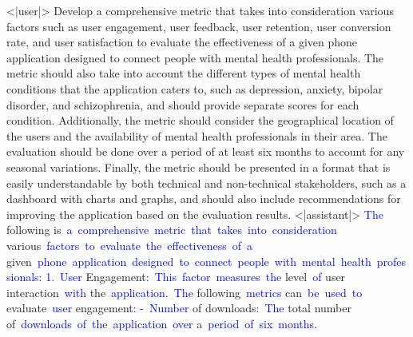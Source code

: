 \documentclass{article}
\begin{document}
\begin{tcolorbox}[colframe=black,colback=white]
<|user|>
Develop a comprehensive metric that takes into consideration various factors such as user engagement, user feedback, user retention, user conversion rate, and user satisfaction to evaluate the effectiveness of a given phone application designed to connect people with mental health professionals. The metric should also take into account the different types of mental health conditions that the application caters to, such as depression, anxiety, bipolar disorder, and schizophrenia, and should provide separate scores for each condition. Additionally, the metric should consider the geographical location of the users and the availability of mental health professionals in their area. The evaluation should be done over a period of at least six months to account for any seasonal variations. Finally, the metric should be presented in a format that is easily understandable by both technical and non-technical stakeholders, such as a dashboard with charts and graphs, and should also include recommendations for improving the application based on the evaluation results.
<|assistant|>
\textcolor{blue}{The} following is\textcolor{blue}{~a}\textcolor{blue}{~comprehensive}\textcolor{blue}{~metric}\textcolor{blue}{~that}\textcolor{blue}{~takes}\textcolor{blue}{~into}\textcolor{blue}{~consideration} various\textcolor{blue}{~factors}\textcolor{blue}{~to}\textcolor{blue}{~evaluate}\textcolor{blue}{~the}\textcolor{blue}{~effectiveness}\textcolor{blue}{~of}\textcolor{blue}{~a} given\textcolor{blue}{~phone}\textcolor{blue}{~application}\textcolor{blue}{~designed}\textcolor{blue}{~to}\textcolor{blue}{~connect}\textcolor{blue}{~people}\textcolor{blue}{~with}\textcolor{blue}{~mental}\textcolor{blue}{~health}\textcolor{blue}{~professionals}:
\textcolor{blue}{1}\textcolor{blue}{.}\textcolor{blue}{~User} Engagement\textcolor{blue}{:}\textcolor{blue}{~This}\textcolor{blue}{~factor}\textcolor{blue}{~measures}\textcolor{blue}{~the} level\textcolor{blue}{~of} user interaction\textcolor{blue}{~with} the\textcolor{blue}{~application}\textcolor{blue}{.}\textcolor{blue}{~The} following\textcolor{blue}{~metrics} can\textcolor{blue}{~be}\textcolor{blue}{~used}\textcolor{blue}{~to} evaluate\textcolor{blue}{~user} engagement\textcolor{blue}{:
}\textcolor{blue}{-}\textcolor{blue}{~Number} of downloads:\textcolor{blue}{~The} total number of\textcolor{blue}{~downloads}\textcolor{blue}{~of}\textcolor{blue}{~the}\textcolor{blue}{~application}\textcolor{blue}{~over} a\textcolor{blue}{~period}\textcolor{blue}{~of}\textcolor{blue}{~six}\textcolor{blue}{~months}\textcolor{blue}{.
}
\end{tcolorbox}
\end{document}
